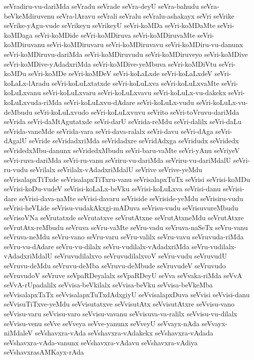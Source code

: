 {seVradiru-vu-dariMda
seVradu
seVrade
seVra-deyU
seVra-bahudu
seVra-beVkeMdiruvenu
seVra-lAravu
seVrali
seVralu
seVralu-ashakayx
seVri
seVrike
seVrike-yAgu-vude
seVrikeyu
seVrikeyU
seVri-koMDa
seVri-koMDaMte
seVri-koMDaga
seVri-koMDide
seVri-koMDiruva
seVri-koMDiruvaMte
seVri-koMDiruvanu
seVri-koMDiruvaru
seVri-koMDiruvavu
seVri-koMDiru-vu-danunx
seVri-koMDiruvu-dariMda
seVri-koMDiruvudu
seVri-koMDiruveyo
seVri-koMDive
seVri-koMDive-yAdadxriMda
seVri-koMDive-yeMbuva
seVri-koMDiVtu
seVri-koMDu
seVri-koMDe
seVri-koMDeV
seVri-koLaLxde
seVri-koLaLxdeV
seVri-koLaLx-lAradu
seVri-koLuLxtatxde
seVri-koLuLxva
seVri-koLuLxvaMte
seVri-koLuLxvanu
seVri-koLuLxvaru
seVri-koLuLxvavu
seVri-koLuLx-vu-dakekx
seVri-koLuLxvuda-riMda
seVri-koLuLxvu-dAdare
seVri-koLuLx-vudu
seVri-koLuLx-vu-deMbudu
seVri-koLuLxvudo
seVri-koLuLxvuvu
seVrito
seVri-toVruvu-dariMda
seVrida
seVri-daMtAgutatxde
seVri-darU
seVrida-reMdu
seVri-dalilx
seVri-daLu
seVrida-vaneMde
seVrida-vara
seVri-dava-ralalx
seVri-davu
seVri-dAga
seVri-dAgalU
seVride
seVridadxriMda
seVridadxre
seVridAdxga
seVridudx
seVridedx
seVridedxMbu-danunx
seVridedxMbudu
seVri-baru-vaMte
seVri-yAnu
seVriyeV
seVri-ruva-dariMda
seVri-ru-vanu
seVriru-vu-dariMda
seVriru-vu-dariMdalU
seVri-ru-vudu
seVrilalx
seVrilalx-vAdadxriMdalU
seVrive
seVrive-yeMdu
seVrisalapxTiTxde
seVrisalapxTiTxru-vanu
seVrisalapxTuTx
seVrisi
seVrisi-koMDu
seVrisi-koDu-vudeV
seVrisi-koLaLx-beVku
seVrisi-koLuLxva
seVrisi-danu
seVrisi-dare
seVrisi-dava-naMte
seVrisi-davaru
seVriside
seVriside-yeMdu
seVrisiru-vudu
seVrisi-heVLide
seVrisu-vudakAkxgi-mADuva
seVrisu-vudu
seVrisuvureMbudu
seVrisoVNa
seVrutatxde
seVrutatxve
seVrutAtxne
seVrutAtxneMdu
seVrutAtxre
seVrutAtx-reMbudu
seVruva
seVru-vaMte
seVru-vadu
seVruva-naSeTx
seVru-vanu
seVruva-neMdu
seVru-vano
seVru-varu
seVru-valilx
seVru-vavu
seVruvuda-riMda
seVru-vu-dAdare
seVru-vu-dilalx
seVru-vudilalx-vAdadxriMda
seVru-vudilalx-vAdadxriMdalU
seVruvudilalxvo
seVruvudilalxvoV
seVru-vudu
seVruvudU
seVruvu-deMdu
seVruvu-deMba
seVruvu-deMbude
seVruvudeV
seVruvudo
seVruvudoV
seVruve
seVpaRDeyalalx
seVpaRDeyU
seVva
seVvaka-riMda
seVvA
seVvA-rUpadalilx
seVvisa-beVkilalx
seVvisa-beVku
seVvisa-beVkeMba
seVvisalapxTaTx
seVvisalapxTuTxdAdxgiyU
seVvisalapxDuva
seVvisi
seVvisi-danu
seVvisuTiTxve-yeMdu
seVvisutatxve
seVvisutAtx
seVvisutAtxre
seVvisu-vano
seVvisu-varu
seVvisu-varo
seVvisu-vavanu
seVvisuva-va-ralilx
seVvisu-vu-dilalx
seVvisu-venu
seVve
seVveya
seVve-yanunx
seVveyU
seVvayx-nAda
seVvayx-niMdaleV
seVshavxra-vAda
seVshavxra-vAdakekx
seVshavxra-vAdada
seVshavxra-vAda-vanunx
seVshavxra-vAdavu
seVshavxra-vAdiya
seVshavxrasAMKayx-rAda
}
